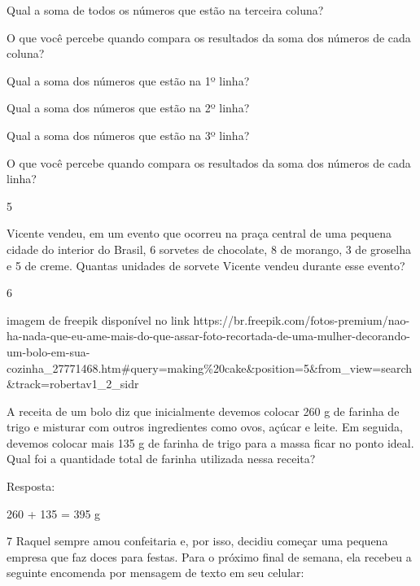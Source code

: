 \begin{escolha}
\begin{escolha}
\item
  Qual a soma de todos os números que estão na terceira coluna?

\item
  O que você percebe quando compara os resultados da soma dos números de
  cada coluna?

\item
  Qual a soma dos números que estão na 1º linha?

\item
  Qual a soma dos números que estão na 2º linha?

\item
  Qual a soma dos números que estão na 3º linha?

\item
  O que você percebe quando compara os resultados da soma dos números de
  cada linha?
\end{escolha}

\num{5}

Vicente vendeu, em um evento que ocorreu na praça central de uma pequena
cidade do interior do Brasil, 6 sorvetes de chocolate, 8 de morango, 3
de groselha e 5 de creme. Quantas unidades de sorvete Vicente vendeu durante esse evento?


\num{6}

\Inserir imagem de freepik disponível no link https://br.freepik.com/fotos-premium/nao-ha-nada-que-eu-ame-mais-do-que-assar-foto-recortada-de-uma-mulher-decorando-um-bolo-em-sua-cozinha_27771468.htm#query=making\%20cake\&position=5\&from_view=search\&track=robertav1_2_sidr

A receita de um bolo diz que inicialmente devemos colocar 260 g de
farinha de trigo e misturar com outros ingredientes como ovos, açúcar e
leite. Em seguida, devemos colocar mais 135 g de farinha de trigo para a
massa ficar no ponto ideal. Qual foi a quantidade total de farinha
utilizada nessa receita?


Resposta:

260 + 135 = 395 g

\num{7} Raquel sempre amou confeitaria e, por isso, decidiu começar uma pequena empresa que faz doces para festas. Para o próximo final de semana, ela
recebeu a seguinte encomenda por mensagem de texto em seu celular:


\end{escolha}
